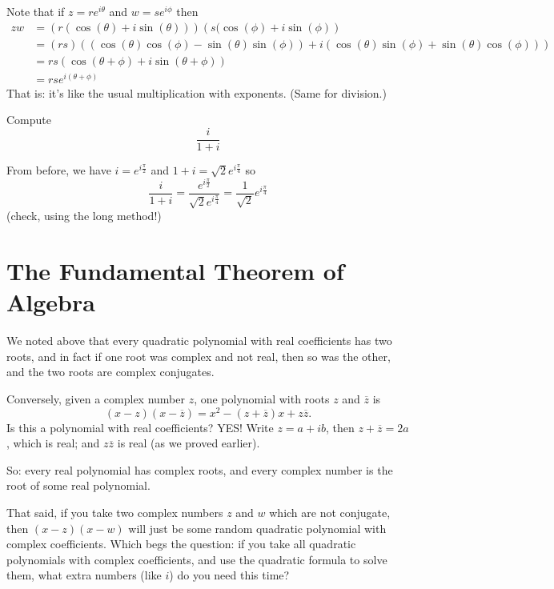 Note that if $z = re^{i\theta}$ and $w = se^{i\phi}$ then
\begin{align*}
zw &= \left( r(\cos(\theta)+i\sin(\theta)) \right) \left(s (\cos(\phi)+i\sin(\phi)\right) \\
&= (rs)\left( (\cos(\theta)\cos(\phi) - \sin(\theta)\sin(\phi)) + i(\cos(\theta)\sin(\phi) + \sin(\theta)\cos(\phi)) \right)\\
&= rs(\cos(\theta + \phi) + i\sin(\theta + \phi))\\
&= rse^{i(\theta+\phi)}
\end{align*}
That is:  it's like the usual multiplication with exponents.  (Same for
division.)
 
\begin{myprob}
Compute
$$
\frac{i}{1+i}
$$

\begin{mysol}
From before, we have $i = e^{i\frac{\pi}{2}}$ and 
$1+i = \sqrt{2}e^{i\frac{\pi}{4}}$
so
$$
\frac{i}{1+i} = \frac{e^{i\frac{\pi}{2}}}{\sqrt{2}e^{i\frac{\pi}{4}}}
 = \frac{1}{\sqrt{2}}e^{i\frac{\pi}{4}}
$$
(check, using the long method!)

\end{mysol}
\end{myprob}

\section{The Fundamental Theorem of Algebra}



We noted above that every quadratic polynomial with real
coefficients has two roots, and in fact if one root was
complex and not real, then so was the other, and the two
roots are complex conjugates.

Conversely, given a complex number $z$, one polynomial
with roots $z$ and $\overline{z}$ is 
$$
(x-z)(x-\overline{z}) = x^2 -(z+\overline{z})x + z \overline{z}.
$$
Is this a polynomial with real coefficients?  YES!  Write
$z = a+ib$, then $z+\overline{z} = 2a$, which is real; and
$z \overline{z}$ is real (as we proved earlier).  

So:  every real polynomial has complex roots, and every
complex number is the root of some real polynomial.  

That said, if you take two complex numbers $z$ and $w$ which
are not conjugate, then $(x-z)(x-w)$ will just be some
random quadratic polynomial with complex coefficients.
Which begs the question:  if you take all quadratic polynomials
with complex coefficients, and use the quadratic formula to
solve them, what extra numbers (like $i$) do you need this 
time?  

